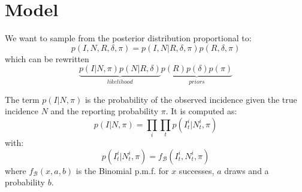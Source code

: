 \documentclass[a4paper,11pt]{article}
\newcommand{\R}{\mathbb{R}}
\begin{document}
% 


\section{Model}

We want to sample from the posterior distribution proportional to:
\begin{equation}
 p(I, N, R, \delta, \pi) = p(I, N | R, \delta, \pi)  
 p(R, \delta, \pi)
\end{equation}
which can be rewritten
\begin{equation}
\underbrace{p(I | N, \pi) p(N | R, \delta) }_{likelihood} 
\underbrace{p(R) p(\delta) p(\pi)}_{priors} 
\end{equation}

The term $p(I | N, \pi)$ is the probability of the observed incidence given the 
true incidence $N$ and the reporting probability $\pi$.
It is computed as:
\begin{equation}
p(I | N, \pi) = \prod_{i}\prod_{t} p(I_t^i| N_t^i, \pi)
\end{equation}
with:
\begin{equation}
p(I_t^i| N_t^i, \pi) = f_\mathcal{B}(I_t^i, N_t^i, \pi)
\end{equation}
where $f_\mathcal{B}(x,a,b)$ is the Binomial p.m.f. for $x$ successes, $a$ draws 
and a probability $b$.
\\
\end{document}
